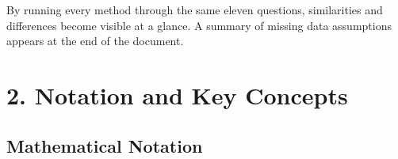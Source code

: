 \documentclass[11pt]{article}
\begin{document}
By running every method through the same eleven questions, similarities and differences become visible at a glance. A summary of missing data assumptions appears at the end of the document.

\newpage

\section*{2. Notation and Key Concepts}

\subsection*{Mathematical Notation}
\end{document}

